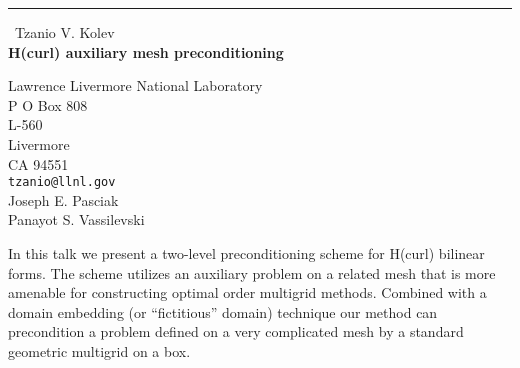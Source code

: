 \documentclass{report}
\begin{document}
\begin{center}
\rule{6in}{1pt} \
{\large Tzanio V. Kolev \\
{\bf H(curl) auxiliary mesh preconditioning}}

Lawrence Livermore National Laboratory \\ P O Box 808 \\ L-560 \\ Livermore \\ CA 94551
\\
{\tt tzanio@llnl.gov}\\
Joseph E. Pasciak\\
Panayot S. Vassilevski\end{center}

In this talk we present a two-level preconditioning scheme for H(curl)
bilinear forms. The scheme utilizes an auxiliary problem on a related
mesh that is more amenable for constructing optimal order multigrid
methods. Combined with a domain embedding (or ``fictitious'' domain)
technique our method can precondition a problem defined on a very
complicated mesh by a standard geometric multigrid on a box.
\end{document}
